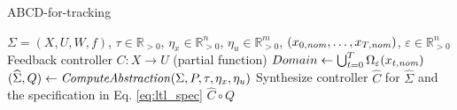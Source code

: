 
\begin{algorithm}
	\caption{ABCD-for-tracking}
	\label{alg:abcd-with-time-for-tracking}
	\begin{algorithmic}[1]
		\Require $\Sigma=(X,U,W,f)$, $\tau \in \mathbb{R}_{>0}$, $\eta_x\in \mathbb{R}^n_{>0}$, $\eta_u\in \mathbb{R}^m_{>0}$, $(x_{0,\mathit{nom}},\ldots,x_{T,\mathit{nom}})$, $\varepsilon \in \mathbb{R}_{>0}^{n}$
		\Ensure Feedback controller $C\colon X\to U$ (partial function)
		\State $Domain \gets \bigcup_{t=0}^T\Omega_{\varepsilon}(x_{t,\mathit{nom}})$
		\State $(\widehat{\Sigma},Q) \gets \mathit{ComputeAbstraction}(\Sigma, P, \tau, \eta_{x} , \eta_u)$
		\State Synthesize controller $\widehat{C}$ for $\widehat{\Sigma}$ and the specification in Eq. \eqref{eq:ltl_spec} %
		\State \Return $\widehat{C}\circ Q$
	\end{algorithmic}
\end{algorithm}
